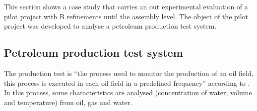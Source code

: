 %


This section shows a case study that carries an out experimental evaluation of
a pilot project with B refinements until the assembly level. The object of
the pilot project was developed to analyse a petroleum production test system.  



\subsection{Petroleum production test system}



The production test is ``the process used to  monitor the production of an oil
field, this process is executed in each oil field in a predefined frequency''
according to \cite{LAUT_SERGIO}. In this process, some characteristics
are analysed (concentration of water, volume and temperature) from oil, gas and
water.



